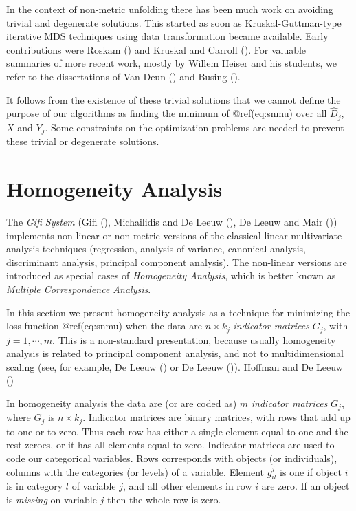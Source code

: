 \documentclass[
  12pt,
  letterpaper,
  DIV=11,
  numbers=noendperiod]{scrartcl}
\begin{document}
In the context of non-metric unfolding there has been much work on
avoiding trivial and degenerate solutions. This started as soon as
Kruskal-Guttman-type iterative MDS techniques using data transformation
became available. Early contributions were Roskam
() and Kruskal and Carroll
(). For valuable summaries of
more recent work, mostly by Willem Heiser and his students, we refer to
the dissertations of Van Deun () and
Busing ().

It follows from the existence of these trivial solutions that we cannot
define the purpose of our algorithms as finding the minimum of
@ref(eq:snmu) over all \(\hat D_j\), \(X\) and \(Y_j\). Some constraints
on the optimization problems are needed to prevent these trivial or
degenerate solutions.

\section{Homogeneity Analysis}\label{hom}

The \emph{Gifi System} (Gifi (),
Michailidis and De Leeuw
(), De Leeuw and Mair
()) implements non-linear or
non-metric versions of the classical linear multivariate analysis
techniques (regression, analysis of variance, canonical analysis,
discriminant analysis, principal component analysis). The non-linear
versions are introduced as special cases of \emph{Homogeneity Analysis},
which is better known as \emph{Multiple Correspondence Analysis}.

In this section we present homogeneity analysis as a technique for
minimizing the loss function @ref(eq:snmu) when the data are
\(n\times k_j\) \emph{indicator matrices} \(G_j\), with
\(j=1,\cdots,m\). This is a non-standard presentation, because usually
homogeneity analysis is related to principal component analysis, and not
to multidimensional scaling (see, for example, De Leeuw
() or De Leeuw
()). Hoffman and De Leeuw
()

In homogeneity analysis the data are (or are coded as) \(m\)
\emph{indicator matrices} \(G_j\), where \(G_j\) is \(n\times k_j\).
Indicator matrices are binary matrices, with rows that add up to one or
to zero. Thus each row has either a single element equal to one and the
rest zeroes, or it has all elements equal to zero. Indicator matrices
are used to code our categorical variables. Rows corresponds with
objects (or individuals), columns with the categories (or levels) of a
variable. Element \(g_{il}^j\) is one if object \(i\) is in category
\(l\) of variable \(j\), and all other elements in row \(i\) are zero.
If an object is \emph{missing} on variable \(j\) then the whole row is
zero.
\end{document}
